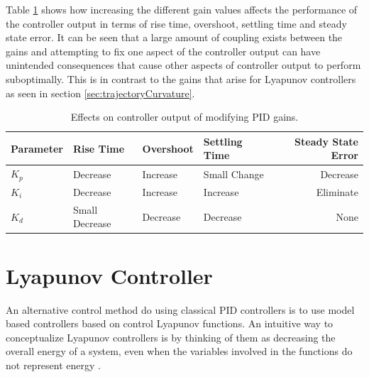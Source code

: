 Table \ref{tab:PIDGainEffects} shows how increasing the different gain values affects the performance of the controller output in terms of rise time, overshoot, settling time and steady state error. It can be seen that a large amount of coupling exists between the gains and attempting to fix one aspect of the controller output can have unintended consequences that cause other aspects of controller output to perform suboptimally. This is in contrast to the gains that arise for Lyapunov controllers as seen in section \ref{sec:trajectoryCurvature}.


\begin{table}[ht!]
\caption{Effects on controller output of modifying PID gains.}
\small
\centering
\begin{tabular}{@{}llllr@{}} \toprule
Parameter    & Rise Time      & Overshoot & Settling Time & Steady State Error \\ \midrule
$K_p$        & Decrease       & Increase  & Small Change  & Decrease \\
$K_i$        & Decrease       & Increase  & Increase      & Eliminate \\
$K_d$        & Small Decrease & Decrease  & Decrease      & None \\ \bottomrule
\end{tabular}
\label{tab:PIDGainEffects}
\end{table}

\section{Lyapunov Controller}
\label{sec:lyapunov}
An alternative control method do using classical PID controllers is to use model based controllers based on control Lyapunov functions. An intuitive way to conceptualize Lyapunov controllers is by thinking of them as decreasing the overall energy of a system, even when the variables involved in the functions do not represent energy \cite{Khalil02}.

